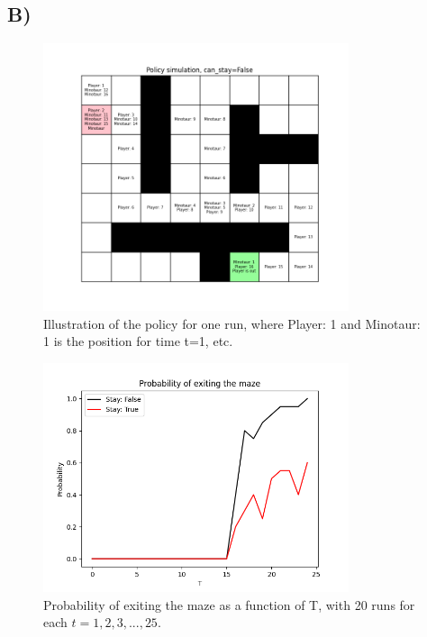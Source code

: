 \documentclass{article}
\begin{document}
\subsection*{B)}
\begin{figure}[H]
    \centering
    \includegraphics[width=0.8\textwidth]{Lab_1/images/problem_1/MazeRun_Nov-16-2020_11-55-45.png}
    \caption{\small Illustration of the policy for one run, where Player: 1 and Minotaur: 1 is the position for time t=1, etc. }
    \label{fig:Policy}
\end{figure}

\begin{figure}[H]
    \centering
    \includegraphics[width=0.8\textwidth]{Lab_1/images/problem_1/probability_of_exiting_the_maze_2.png}
    \caption{\small Probability of exiting the maze as a function of T, with 20 runs for each $t=1,2,3,...,25$.}
    \label{fig:probability_exiting}
\end{figure}
\end{document}

